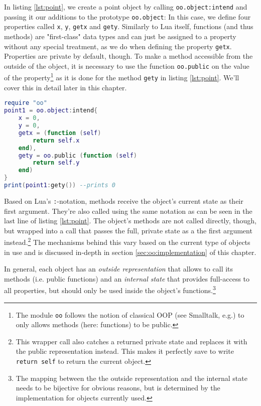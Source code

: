 In listing \ref{lst:point}, we create a point object by calling \texttt{oo.object:intend} and passing it our additions to the prototype \texttt{oo.object}: In this case, we define four properties called \texttt{x}, \texttt{y}, \texttt{getx} and \texttt{gety}. Similarly to Lua itself, functions (and thus methods) are "first-class" data types and can just be assigned to a property without any special treatment, as we do when defining the property \texttt{getx}. Properties are private by default, though. To make a method accessible from the outside of the object, it is necessary to use the function \texttt{oo.public} on the value of the property\footnote{The module \texttt{oo} follows the notion of classical OOP (see Smalltalk, e.g.) to only allows methods (here: functions) to be public.} as it is done for the method \texttt{gety} in listing \ref{lst:point}. We'll cover this in detail later in this chapter.

\begin{lstlisting}[language=lua, caption={Creating an object with the \texttt{oo} module.}, label=lst:point, name=lst:point]
require "oo"
point1 = oo.object:intend{
	x = 0,
	y = 0,
	getx = (function (self)
		return self.x
	end),
	gety = oo.public (function (self)
		return self.y
	end)
}
print(point1:gety()) --prints 0
\end{lstlisting}

Based on Lua's \texttt{:}-notation, methods receive the object's current state as their first argument. They're also called using the same notation as can be seen in the last line of listing \ref{lst:point}. The object's methods are not called directly, though, but wrapped into a call that passes the full, private state as a the first argument instead.\footnote{This wrapper call also catches a returned private state and replaces it with the public representation instead. This makes it perfectly save to write \texttt{return self} to return the current object.} The mechanisms behind this vary based on the current type of objects in use and is discussed in-depth in section \ref{sec:oo:implementation} of this chapter.

In general, each object has an \emph{outside representation} that allows to call its methods (i.e. public functions) and an \emph{internal state} that provides full-access to all properties, but should only be used inside the object's functions.\footnote{The mapping between the the outside representation and the internal state needs to be bijective for obvious reasons, but is determined by the implementation for objects currently used.}

